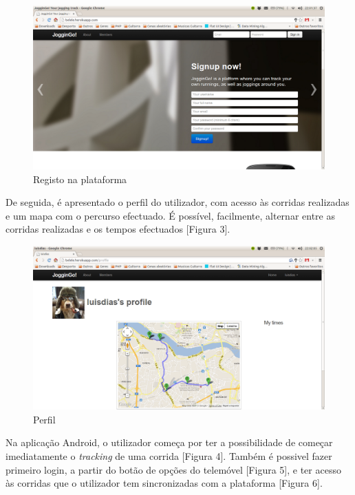 \documentclass[15pt,a4paper]{article}
\begin{document}
\begin{figure}[htp]
  \centering
  \includegraphics[scale=0.3]{print1.png}
  \caption{Registo na plataforma}
\end{figure}

De seguida, é apresentado o perfil do utilizador, com acesso às corridas realizadas e um mapa com o percurso efectuado. É possível, facilmente, alternar entre as corridas realizadas e os tempos efectuados [Figura 3].

\begin{figure}[htp]
  \centering
  \includegraphics[scale=0.3]{print2.png}
  \caption{Perfil}
\end{figure}

Na aplicação Android, o utilizador começa por ter a possibilidade de começar imediatamente o \textit{tracking} de uma corrida [Figura 4]. Também é possivel fazer primeiro login, a partir do botão de opções do telemóvel [Figura 5], e ter acesso às corridas que o utilizador tem sincronizadas com a plataforma [Figura 6].
\end{document}
